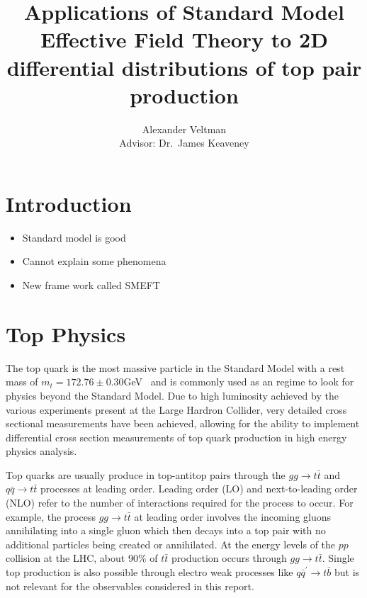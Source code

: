 \documentclass[a4paper,11pt]{article}
\title{Applications of Standard Model Effective Field Theory to 2D differential distributions of top pair production}
\author{Alexander Veltman\\{\small Advisor: Dr.\ James Keaveney}}
\affil{Department of Physics,\\University of Cape Town}
\begin{document}
\maketitle

\begin{abstract}
\end{abstract}

\section{Introduction}

\begin{itemize}
    \item Standard model is good
    \item Cannot explain some phenomena
    \item New frame work called SMEFT
\end{itemize}


\section{Top Physics}

The top quark is the most massive particle in the Standard Model with a rest mass of $m_{t} =172.76\pm0.30$GeV~\cite{ParticleDataGroup:2020ssz} and is commonly used as an regime to look for physics beyond the Standard Model.
Due to high luminosity achieved by the various experiments present at the Large Hardron Collider, very detailed cross sectional measurements have been achieved, allowing for the ability to implement differential cross section measurements of top quark production in high energy physics analysis.

Top quarks are usually produce in top-antitop pairs through the $gg\rightarrow t\bar{t}$ and $q\bar{q}\rightarrow t\bar{t}$ processes at leading order.
Leading order (LO) and next-to-leading order (NLO) refer to the number of interactions required for the process to occur.
For example, the process $gg\rightarrow t\bar{t}$ at leading order involves the incoming gluons annihilating into a single gluon which then decays into a top pair with no additional particles being created or annihilated.
At the energy levels of the $pp$ collision at the LHC, about 90\% of $t\bar{t}$ production occurs through $gg\rightarrow t\bar{t}$.
Single top production is also possible through electro weak processes like $q\bar{q}^{\prime}\rightarrow t\bar{b}$ but is not relevant for the observables considered in this report.
\end{document}
